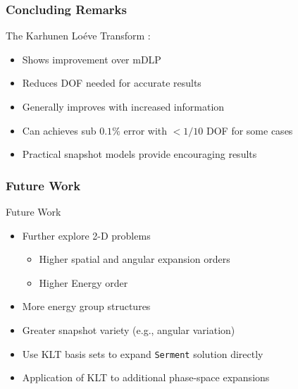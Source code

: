 \documentclass[fleqn]{beamer}
\begin{document}
  
  \begin{frame}
    \frametitle{Concluding Remarks}
    \begin{block}{The Karhunen Lo\'{e}ve Transform :}
      \begin{itemize}
	\item Shows improvement over mDLP
	\item Reduces DOF needed for accurate results
	\item Generally improves with increased information
	\item Can achieves sub $0.1\%$ error with $<1/10$ DOF for some cases
    \item Practical snapshot models provide encouraging results
      \end{itemize}
    \end{block}
\end{frame}

\begin{frame}
    \frametitle{Future Work}
    \begin{block}{Future Work}
      \begin{itemize}
	\item Further explore 2-D problems
    \begin{itemize}
        \item Higher spatial and angular expansion orders
        \item Higher Energy order
    \end{itemize}
	\item More energy group structures
	\item Greater snapshot variety (e.g., angular variation)
    \item Use KLT basis sets to expand {\tt Serment} solution directly
    \item Application of KLT to additional phase-space expansions
      \end{itemize}
    \end{block}
    \nocite{*}
  \end{frame}
  
\end{document}
